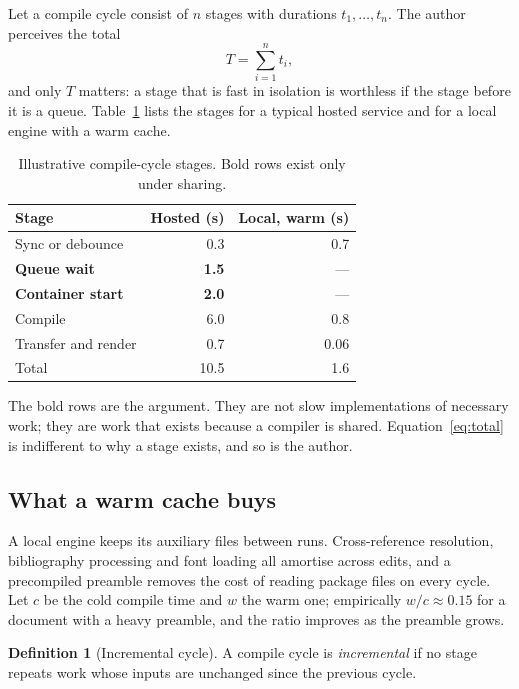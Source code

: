 \documentclass[11pt,a4paper]{article}
\theoremstyle{definition}
\newtheorem{definition}[theorem]{Definition}
\begin{document}
Let a compile cycle consist of $n$ stages with durations $t_1, \dots, t_n$. The author perceives
the total
\begin{equation}
  T = \sum_{i=1}^{n} t_i ,
  \label{eq:total}
\end{equation}
and only $T$ matters: a stage that is fast in isolation is worthless if the stage before it is a
queue. Table~\ref{tab:stages} lists the stages for a typical hosted service and for a local
engine with a warm cache.

\begin{table}[ht]
  \centering
  \caption{Illustrative compile-cycle stages. Bold rows exist only under sharing.}
  \label{tab:stages}
  \begin{tabular}{lrr}
    \toprule
    Stage & Hosted (s) & Local, warm (s) \\
    \midrule
    Sync or debounce        & 0.3 & 0.7 \\
    \textbf{Queue wait}     & \textbf{1.5} & --- \\
    \textbf{Container start} & \textbf{2.0} & --- \\
    Compile                 & 6.0 & 0.8 \\
    Transfer and render     & 0.7 & 0.06 \\
    \midrule
    Total                   & 10.5 & 1.6 \\
    \bottomrule
  \end{tabular}
\end{table}

The bold rows are the argument. They are not slow implementations of necessary work; they are
work that exists because a compiler is shared. Equation~\eqref{eq:total} is indifferent to why a
stage exists, and so is the author.

\subsection{What a warm cache buys}

A local engine keeps its auxiliary files between runs. Cross-reference resolution, bibliography
processing and font loading all amortise across edits, and a precompiled preamble removes the
cost of reading package files on every cycle. Let $c$ be the cold compile time and $w$ the warm
one; empirically $w / c \approx 0.15$ for a document with a heavy preamble, and the ratio
improves as the preamble grows.

\begin{definition}[Incremental cycle]
  A compile cycle is \emph{incremental} if no stage repeats work whose inputs are unchanged
  since the previous cycle.
\end{definition}
\end{document}
